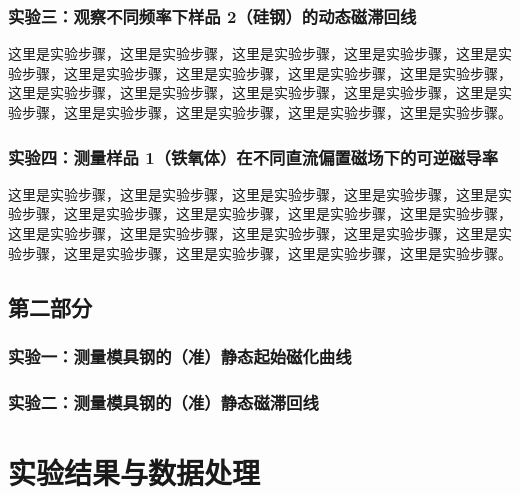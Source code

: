 \documentclass[UTF8]{article}
\theoremstyle{MyLineTheoremStyle} %
\theoremstyle{MyBlockTheoremStyle} %
\theoremstyle{MySubsubsectionStyle} %
\begin{document}
\subsubsection{实验三：观察不同频率下样品 2（硅钢）的动态磁滞回线}

这里是实验步骤，这里是实验步骤，这里是实验步骤，这里是实验步骤，这里是实验步骤，这里是实验步骤，这里是实验步骤，这里是实验步骤，这里是实验步骤，这里是实验步骤，这里是实验步骤，这里是实验步骤，这里是实验步骤，这里是实验步骤，这里是实验步骤，这里是实验步骤，这里是实验步骤，这里是实验步骤。


\subsubsection{实验四：测量样品 1（铁氧体）在不同直流偏置磁场下的可逆磁导率}

这里是实验步骤，这里是实验步骤，这里是实验步骤，这里是实验步骤，这里是实验步骤，这里是实验步骤，这里是实验步骤，这里是实验步骤，这里是实验步骤，这里是实验步骤，这里是实验步骤，这里是实验步骤，这里是实验步骤，这里是实验步骤，这里是实验步骤，这里是实验步骤，这里是实验步骤，这里是实验步骤。



\subsection{第二部分}

\subsubsection{实验一：测量模具钢的（准）静态起始磁化曲线}

\subsubsection{实验二：测量模具钢的（准）静态磁滞回线}


\newpage
\section{实验结果与数据处理}
\end{document}
